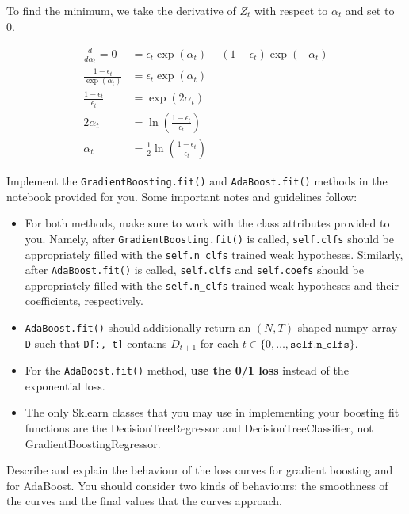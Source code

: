 \begin{solution}
	To find the minimum, we take the derivative of $Z_t$ with respect to $\alpha_t$ and set to 0.

    \begin{align*}
        \frac{d}{d \alpha_t} = 0 &= \epsilon_t \exp(\alpha_t) - (1-\epsilon_t) \exp(-\alpha_t)\\
        \frac{1 - \epsilon_t}{\exp(\alpha_t)} &= \epsilon_t \exp(\alpha_t)\\
        \frac{1-\epsilon_t}{\epsilon_t} &= \exp(2 \alpha_t)\\
        2 \alpha_t &= \ln\left( \frac{1-\epsilon_t}{\epsilon_t}\right)\\
        \alpha_t &= \frac{1}{2} \ln \left(\frac{1-\epsilon_t}{\epsilon_t}\right)
    \end{align*}
\end{solution}

\newpage

\begin{problem}[14]
    Implement the \texttt{GradientBoosting.fit()} and \texttt{AdaBoost.fit()} methods in the notebook provided for you. Some important notes and guidelines follow:
    \begin{itemize}
        \item For both methods, make sure to work with the class attributes provided to you. Namely, after \texttt{GradientBoosting.fit()} is called, \texttt{self.clfs} should be appropriately filled with the \texttt{self.n_clfs} trained weak hypotheses. Similarly, after \texttt{AdaBoost.fit()} is called, \texttt{self.clfs} and \texttt{self.coefs} should be appropriately filled with the \texttt{self.n_clfs} trained weak hypotheses and their coefficients, respectively.
        \item \texttt{AdaBoost.fit()} should additionally return an $(N, T)$ shaped numpy array \texttt{D} such that \texttt{D[:, t]} contains $D_{t+1}$ for each $t \in \{0, \ldots, \texttt{self.n_clfs}\}$.
        \item For the \texttt{AdaBoost.fit()} method, \textbf{use the 0/1 loss} instead of the exponential loss.
	\item The only Sklearn classes that you may use in implementing your boosting fit functions are the DecisionTreeRegressor and DecisionTreeClassifier, not GradientBoostingRegressor.
    \end{itemize}
\end{problem}

\begin{problem}[2]
    Describe and explain the behaviour of the loss curves for gradient boosting and for AdaBoost. You should consider two kinds of behaviours: the smoothness of the curves and the final values that the curves approach.
\end{problem}

